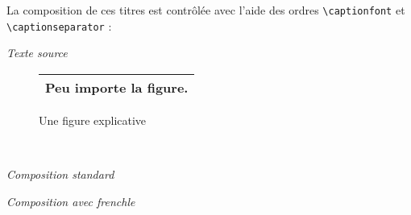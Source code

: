 \documentclass[a4paper,12pt,openright]{article}
\begin{document}
La composition de ces titres est contrôlée avec l’aide des ordres 
\texttt{{\backslash}captionfont}
et\\ \texttt{{\backslash}captionseparator} :

\begin{center} %
\textit{Texte source}\\[1ex]
\begin{boxedverbatim}
\renewcommand{\captionfont}{\upshape
                           \bfseries\selectfont}
\renewcommand{\captionseparator}{$\Rightarrow$}

\begin{figure}
\begin{tabular}{|c|}
\hline
\centerline{Peu importe la figure.}\\
\hline
\end{tabular}
\caption{Une figure explicative}
\end{figure}
\end{boxedverbatim}
\\[.5em]
\setcounter{mpfootnote}{1} %
\renewcommand{\thempfootnote}{\arabic{mpfootnote}}
\parbox{70mm}{
\begin{center}
\textit{Composition standard}
%
\end{center}
}%
\parbox{70mm}{
\begin{center}
\textit{Composition avec frenchle}
\end{center}
}
%
\end{center} %
\end{document}
